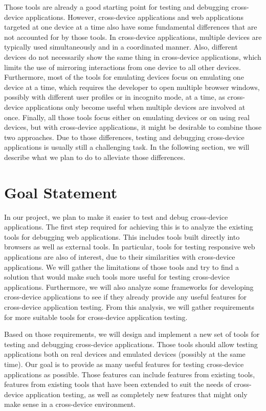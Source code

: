 Those tools are already a good starting point for testing and debugging cross-device applications. However, cross-device applications and web applications targeted at one device at a time also have some fundamental differences that are not accounted for by those tools. In cross-device applications, multiple devices are typically used simultaneously and in a coordinated manner. Also, different devices do not necessarily show the same thing in cross-device applications, which limits the use of mirroring interactions from one device to all other devices. Furthermore, most of the tools for emulating devices focus on emulating one device at a time, which requires the developer to open multiple browser windows, possibly with different user profiles or in incognito mode, at a time, as cross-device applications only become useful when multiple devices are involved at once. Finally, all those tools focus either on emulating devices or on using real devices, but with cross-device applications, it might be desirable to combine those two approaches. Due to those differences, testing and debugging cross-device applications is usually still a challenging task. In the following section, we will describe what we plan to do to alleviate those differences. 

\section{Goal Statement}

In our project, we plan to make it easier to test and debug cross-device applications. The first step required for achieving this is to analyze the existing tools for debugging web applications. This includes tools built directly into browsers as well as external tools. In particular, tools for testing responsive web applications are also of interest, due to their similarities with cross-device applications. We will gather the limitations of those tools and try to find a solution that would make such tools more useful for testing cross-device applications. Furthermore, we will also analyze some frameworks for developing cross-device applications to see if they already provide any useful features for cross-device application testing. From this analysis, we will gather requirements for more suitable tools for cross-device application testing.

Based on those requirements, we will design and implement a new set of tools for testing and debugging cross-device applications. Those tools should allow testing applications both on real devices and emulated devices (possibly at the same time). Our goal is to provide as many useful features for testing cross-device applications as possible. Those features can include features from existing tools, features from existing tools that have been extended to suit the needs of cross-device application testing, as well as completely new features that might only make sense in a cross-device environment.

